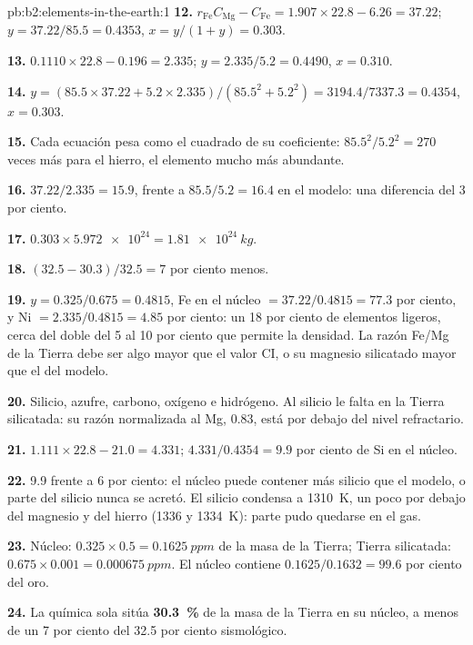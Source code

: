 \begin{solution}{pb:b2:elements-in-the-earth:1}
\textbf{12.} $r_{\mathrm{Fe}}C_{\mathrm{Mg}} - C_{\mathrm{Fe}} = 1.907\times22.8 - 6.26 =
37.22$; $y = 37.22/85.5 = 0.4353$, $x = y/(1+y) = 0.303$.

\textbf{13.} $0.1110\times22.8 - 0.196 = 2.335$; $y = 2.335/5.2 = 0.4490$, $x = 0.310$.

\textbf{14.} $y = (85.5\times37.22 + 5.2\times2.335)/(85.5^2 + 5.2^2) =
3194.4/7337.3 = 0.4354$, $x = 0.303$.

\textbf{15.} Cada ecuación pesa como el cuadrado de su coeficiente: $85.5^2/5.2^2 = 270$
veces más para el hierro, el elemento mucho más abundante.

\textbf{16.} $37.22/2.335 = 15.9$, frente a $85.5/5.2 = 16.4$ en el modelo: una diferencia del 3 por
ciento.

\textbf{17.} $0.303\times\num{5.972e24} = \qty{1.81e24}{kg}$.

\textbf{18.} $(32.5-30.3)/32.5 = 7$ por ciento menos.

\textbf{19.} $y = 0.325/0.675 = 0.4815$, Fe en el núcleo $= 37.22/0.4815 = 77.3$ por ciento,
y Ni $= 2.335/0.4815 = 4.85$ por ciento: un 18 por ciento de elementos ligeros, cerca del doble del 5 al
10 por ciento que permite la densidad. La razón Fe/Mg de la Tierra debe ser algo mayor que el valor
CI, o su magnesio silicatado mayor que el del modelo.

\textbf{20.} Silicio, azufre, carbono, oxígeno e hidrógeno. Al silicio le falta en la
Tierra silicatada: su razón normalizada al Mg, 0.83, está por debajo del nivel refractario.

\textbf{21.} $1.111\times22.8 - 21.0 = 4.331$; $4.331/0.4354 = 9.9$ por ciento de Si en el
núcleo.

\textbf{22.} 9.9 frente a 6 por ciento: el núcleo puede contener más silicio que el modelo, o
parte del silicio nunca se acretó. El silicio condensa a \qty{1310}{K}, un poco
por debajo del magnesio y del hierro (1336 y \qty{1334}{K}): parte pudo quedarse en el gas.

\textbf{23.} Núcleo: $0.325\times0.5 = \qty{0.1625}{ppm}$ de la masa de la Tierra; Tierra
silicatada: $0.675\times0.001 = \qty{0.000675}{ppm}$. El núcleo contiene
$0.1625/0.1632 = 99.6$ por ciento del oro.

\textbf{24.} La química sola sitúa
\textbf{\qty[text-series-to-math=true]{30.3}{\percent}} de la masa de la Tierra en su núcleo,
a menos de un 7 por ciento del 32.5 por ciento sismológico.
\end{solution}
